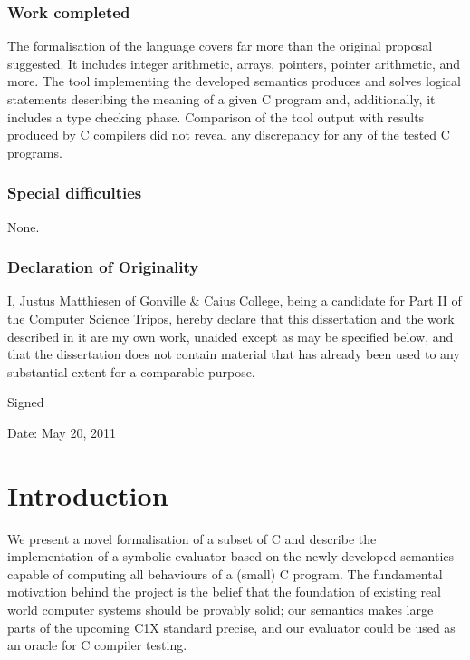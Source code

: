 \documentclass[a4paper,12pt]{scrbook}
\theoremstyle{plain}
\theoremstyle{definition}
\begin{document}
\subsection*{Work completed}
The formalisation of the language covers far more than the original proposal
suggested. It includes integer arithmetic, arrays, pointers, pointer arithmetic,
and more. The tool implementing the developed semantics produces and solves
logical statements describing the meaning of a given C program and,
additionally, it includes a type checking phase. Comparison of the tool output
with results produced by C compilers did not reveal any discrepancy for any of
the tested C programs.

\subsection*{Special difficulties}
None.

\subsection*{Declaration of Originality}
I, Justus Matthiesen of Gonville \& Caius College, being a candidate for Part II
of the Computer Science Tripos, hereby declare that this dissertation and the
work described in it are my own work, unaided except as may be specified below,
and that the dissertation does not contain material that has already been used
to any substantial extent for a comparable purpose.

\vspace{1\baselineskip}
    Signed

\vspace{1\baselineskip}
    Date: May 20, 2011

\tableofcontents

\chapter{Introduction}\label{introduction}
We present a novel formalisation of a subset of C and describe the
implementation of a symbolic evaluator based on the newly developed semantics
capable of computing all behaviours of a (small) C program. The fundamental
motivation behind the project is the belief that the foundation of existing real
world computer systems should be provably solid; our semantics makes large parts
of the upcoming C1X standard precise, and our evaluator could be used as an
oracle for C compiler testing.
\end{document}
